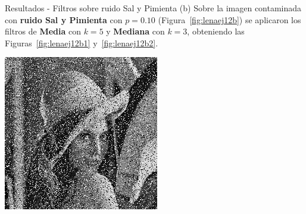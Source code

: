 \documentclass{beamer}
\begin{document}
\begin{frame}[fragile]{Resultados - Filtros sobre ruido Sal y Pimienta (b)}
	\justifying
	Sobre la imagen contaminada con \textcolor{unahurverde}{\textbf{ruido Sal y Pimienta}} con $p=0.10$ (Figura~\ref{fig:lenaej12b})  
	se aplicaron los filtros de \textcolor{unahurverde}{\textbf{Media}} con $k=5$ y \textcolor{unahurverde}{\textbf{Mediana}} con $k=3$, obteniendo las Figuras~\ref{fig:lenaej12b1} y~\ref{fig:lenaej12b2}.
	
	\vspace{0.5cm}
	\centering
	\begin{minipage}{0.32\linewidth}
		\centering
		\includegraphics[width=\linewidth]{../results/lena_ej12b}
		\label{fig:lenaej12b}
	\end{minipage}\hfill
	\begin{minipage}{0.32\linewidth}
		\centering

\end{minipage}
\end{frame}
\end{document}

